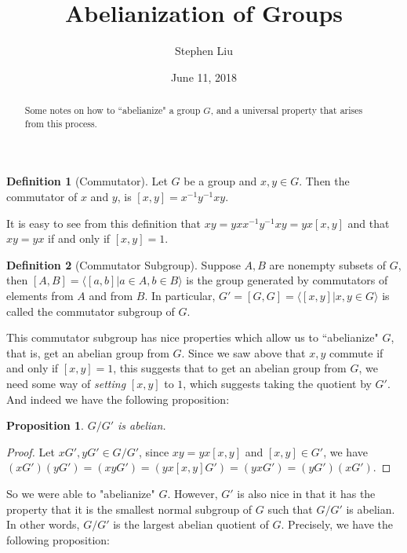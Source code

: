 \documentclass[11pt]{article}
\theoremstyle{definition}
\newtheorem*{defn}{Definition}
\theoremstyle{plain}
\theoremstyle{plain}
\newtheorem{prop}{Proposition}
\theoremstyle{plain}
\begin{document}
\author{Stephen Liu}
\title{Abelianization of Groups}
\date{June 11, 2018}

\maketitle

\begin{abstract}
Some notes on how to ``abelianize" a group $G$, and a universal property that arises from this process.
\end{abstract}

\begin{defn}[Commutator]
Let $G$ be a group and $x,y \in G$. Then the commutator of $x$ and $y$, is $[x,y] = x^{-1}y^{-1}xy$.
\end{defn}

It is easy to see from this definition that $xy=yxx^{-1}y^{-1}xy=yx[x,y]$ and that $xy=yx$ if and only if $[x,y]=1$.

\begin{defn}[Commutator Subgroup]
Suppose $A,B$ are nonempty subsets of $G$, then $[A,B]=\langle[a,b]| a \in A, b \in B\rangle$ is the group generated by commutators of elements from $A$ and from $B$. In particular, $G'=[G,G]=\langle[x,y]|x,y \in G\rangle$ is called the commutator subgroup of $G$.
\end{defn}

This commutator subgroup has nice properties which allow us to ``abelianize" $G$, that is, get an abelian group from $G$. Since we saw above that $x,y$ commute if and only if $[x,y]=1$, this suggests that to get an abelian group from $G$, we need some way of \emph{setting} $[x,y]$ to $1$, which suggests taking the quotient by $G'$. And indeed we have the following proposition:

\begin{prop}
$G/G'$ is abelian.
\end{prop}

\begin{proof}
Let $xG',yG' \in G/G'$, since $xy=yx[x,y]$ and $[x,y] \in G'$, we have $(xG')(yG')=(xyG')=(yx[x,y]G')=(yxG')=(yG')(xG')$.
\end{proof}

So we were able to "abelianize" $G$. However, $G'$ is also nice in that it has the property that it is the smallest normal subgroup of $G$ such that $G/G'$ is abelian. In other words, $G/G'$ is the largest abelian quotient of $G$. Precisely, we have the following proposition:
\end{document}
